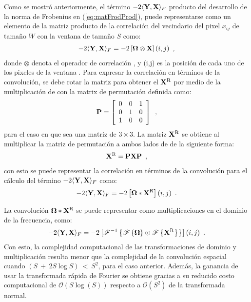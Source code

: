Como se mostró anteriormente, el término $-2\langle\mathbf{Y},\mathbf{X}\rangle_{F}$ producto del desarrollo de la norma de Frobenius en (\ref{eq:matFrodProd}), puede representarse como un elemento de la matriz producto de la correlación del vecindario  del pixel $x_{ij}$ de tama\~no $W$ con la ventana \mat{\Omega} de tama\~no $S$ como:
%
\begin{equation}
-2\langle\mathbf{Y},\mathbf{X}\rangle_{F} = -2\left[\mathbf{\Omega} \otimes \mathbf{X}\right](i,j) \enspace ,
\end{equation}
%
donde $\otimes$ denota el operador de correlaci\'on , y (i,j) es la posici\'on de cada uno de los pixeles de la ventana \mat{\Omega}. 
%
Para expresar la correlación en términos de la convolución, se debe rotar la matriz  para obtener el $\mathbf{X}^\textrm{R}$ por medio de la multiplicaci\'on de  con la matrix de permutaci\'on definida como:
%
\begin{equation}
\mathbf{P} = \left[\begin{array}{ccc}
0 & 0 & 1\\
0 & 1 & 0\\
1 & 0 & 0
\end{array}\right] \enspace ,
\end{equation}
%
para el caso en que  sea una matriz de $3\times 3$. La matriz $\mathbf{X}^\textrm{R}$ se obtiene al multiplicar la matriz de permutaci\'on  a ambos lados de  de la siguiente forma:
%
\begin{equation}
\mathbf{X}^\text{R} = \mathbf{P}\mathbf{X}\mathbf{P} \enspace ,
\end{equation}
%
con esto se puede representar la correlaci\'on en t\'erminos de la convoluci\'on para el c\'alculo del t\'ermino $-2\langle\mathbf{Y},\mathbf{X}\rangle_{F}$ como:
%
\begin{equation}
-2\langle\mathbf{Y},\mathbf{X}\rangle_{F} = -2\left[\mathbf{\Omega} *\mathbf{X}^\text{R}\right](i,j) \enspace .
\end{equation}

La convoluci\'on $\mathbf{\Omega} *\mathbf{X}^\text{R}$ se puede representar como multiplicaciones en el dominio de la frecuencia, como:
%
\begin{equation}
-2\langle\mathbf{Y},\mathbf{X}\rangle_{F} = -2 \left[ \mathscr{F}^{-1}\left\{ \mathscr{F}\left\{\mathbf{\Omega}\right\} \odot \mathscr{F}\left\{\mathbf{X}^\text{R}\right\}\right\} \right](i,j) \enspace .
\end{equation}
%
Con esto, la complejidad computacional de las transformaciones de dominio y multiplicaci\'on resulta menor que la complejidad de la convoluci\'on espacial cuando $(S~+~2S\log{S})~<~S^2$, para el caso anterior. Adem\'as, la ganancia de usar la transformada r\'apida de Fourier se obtiene gracias a su reducido costo computacional de $\mathcal{O}(S\log(S))$ respecto a $\mathcal{O}(S^2)$ de la transformada normal.




